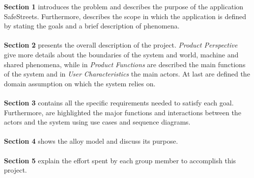 \textbf{Section 1} introduces the problem and describes the purpose of the application SafeStreets. Furthermore, describes the scope in which the application is defined by stating the goals and a brief description of phenomena.\\\\
\textbf{Section 2} presents the overall description of the project. \textit{Product Perspective} give more details about the boundaries of the system and world, machine and shared phenomena, while in \textit{Product Functions} are described the main functions of the system and in \textit{User Characteristics} the main actors. At last are defined the domain assumption on which the system relies on.\\\\
\textbf{Section 3} contains all the specific requirements needed to satisfy each goal. Furthermore, are highlighted the major functions and interactions between the actors and the system using use cases and sequence diagrams.\\\\
\textbf{Section 4} shows the alloy model and discuss its purpose.\\\\
\textbf{Section 5} explain the effort spent by each group member to accomplish this project.\\